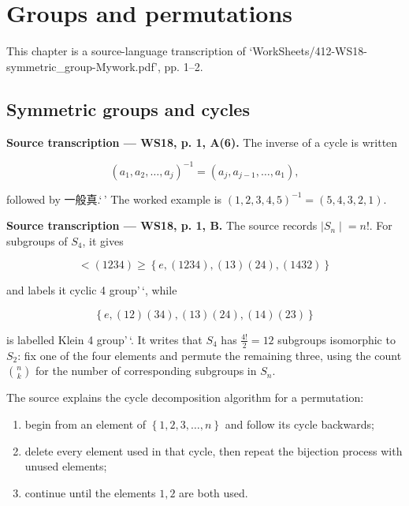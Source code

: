 \chapter{Groups and permutations}\label{groups-and-permutations}

This chapter is a source-language transcription of `WorkSheets/412-WS18-symmetric\_group-Mywork.pdf', pp. 1--2.

\section{Symmetric groups and cycles}

\textbf{Source transcription --- WS18, p. 1, A(6).} The inverse of a cycle is written

\[\left( {a_{1},a_{2},\ldots,a_{j}} \right)^{- 1} = \left( {a_{j},a_{j - 1},\ldots,a_{1}} \right),\]

followed by 一般真.`\,' The worked example is \(\left( {1,2,3,4,5} \right)^{- 1} = \left( {5,4,3,2,1} \right)\).

\textbf{Source transcription --- WS18, p. 1, B.} The source records \(\left. |S_{n} \middle| = n! \right.\). For subgroups of \(S_{4}\), it gives

\[< \left( {1234} \right) \geq \left\{ {e,\left( {1234} \right),\left( {13} \right)\left( {24} \right),\left( {1432} \right)} \right\}\]

and labels it cyclic 4 group'\,`, while

\[\left\{ {e,\left( {12} \right)\left( {34} \right),\left( {13} \right)\left( {24} \right),\left( {14} \right)\left( {23} \right)} \right\}\]

is labelled Klein 4 group'\,`. It writes that \(S_{4}\) has \(\frac{4!}{2} = 12\) subgroups isomorphic to \(S_{2}\): fix one of the four elements and permute the remaining three, using the count \(\binom{n}{k}\) for the number of corresponding subgroups in \(S_{n}\).

The source explains the cycle decomposition algorithm for a permutation:

\begin{enumerate}
\tightlist
\item
  begin from an element of \(\left\{ {1,2,3,\ldots,n} \right\}\) and follow its cycle backwards;
\item
  delete every element used in that cycle, then repeat the bijection process with unused elements;
\item
  continue until the elements \(1,2\) are both used.
\end{enumerate}

